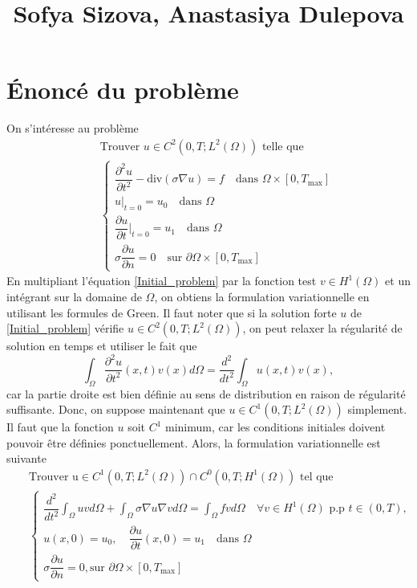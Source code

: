 \documentclass[12pt]{article}
\newcommand{\pd}[2]{ %
	\dfrac{\partial #1}{\partial #2}
}
\begin{document}
	
	\tableofcontents
	\title{Sofya Sizova, Anastasiya Dulepova}
	\maketitle
	\section{Énoncé du problème}
	On s'intéresse au problème 
	\begin{eqnarray}
	\label{Initial_problem}
	& &\text{Trouver } u \in C^2(0, T; L^2(\Omega)) \text{ telle que}\\[2mm]
	& &\begin{cases}
	\dfrac{\partial^2u}{\partial t^2} - \text{div} (\sigma\nabla u) = f \quad  \text{dans } \Omega \times [0, T_\text{max}]\\
	u|_{t = 0} = u_0 \quad \text{dans } \Omega \\
	\pd{u}{t}|_{t = 0} = u_1 \quad \text{dans } \Omega \\
	\sigma \pd{u}{n} = 0 \quad \text{sur } \partial\Omega \times [0, T_\text{max}]
	\end{cases}
	\end{eqnarray}
En multipliant l'équation \eqref{Initial_problem} par la fonction test $v \in H^1(\Omega)$ et un intégrant sur la domaine de $\Omega$, on obtiens la formulation variationnelle en utilisant les formules de Green. Il faut noter que si la solution forte $u$ de \eqref{Initial_problem} vérifie $u \in C^2(0, T; L^2(\Omega))$, on peut relaxer la régularité de solution en temps et utiliser le fait que
\begin{equation}
\int_\Omega{\dfrac{\partial^2u}{\partial t^2}(x,t) v(x)d\Omega} = \frac{d^2}{dt^2} \int_\Omega{u(x,t) v(x)},
\end{equation}
car la partie droite est bien définie au sens de distribution en raison de régularité suffisante. Donc, on suppose maintenant que $u \in C^1(0, T; L^2(\Omega))$ simplement. Il faut que la fonction $u$ soit $C^1$ minimum, car les conditions initiales doivent pouvoir être définies ponctuellement.  Alors, la formulation variationnelle est suivante
\begin{eqnarray}
\nonumber
& &\text{Trouver u} \in C^1(0, T; L^2(\Omega)) \cap C^0(0, T; H^1(\Omega)) \text { tel que}\\
\label{variationnelle}
& &\begin{cases}
\dfrac{d^2}{dt^2} \int_\Omega {u v d\Omega} + \int_\Omega{\sigma \nabla u \nabla v d\Omega} = \int_\Omega{f v d\Omega} \quad \forall v \in H^1(\Omega) \text{ p.p } t \in (0,T),\\
u(x, 0) = u_0, \quad \pd{u}{t}(x,0) = u_1 \quad \text{dans } \Omega \\
\sigma \pd{u}{n} = 0, \text{sur } \partial\Omega \times [0, T_\text{max}]
\end{cases}
\end{eqnarray}
\end{document}
